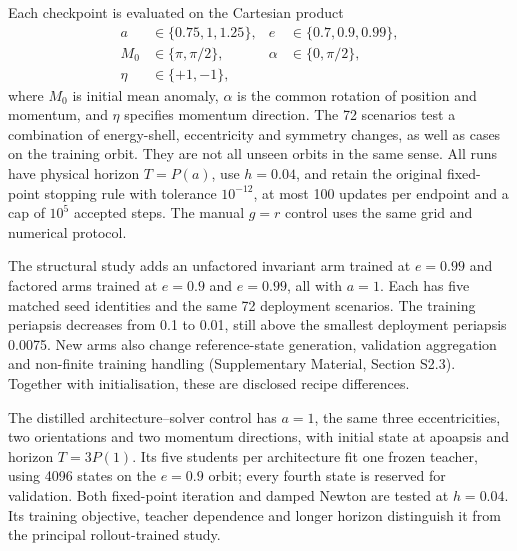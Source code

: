 \documentclass[final,3p,times]{elsarticle}
\begin{document}
Each checkpoint is evaluated on the Cartesian product
\begin{equation}
\begin{aligned}
 a&\in\{0.75,1,1.25\}, & e&\in\{0.7,0.9,0.99\},\\
 M_0&\in\{\pi,\pi/2\}, & \alpha&\in\{0,\pi/2\},\\
 \eta&\in\{+1,-1\},
\end{aligned}
\label{eq:kepler-deployment-grid}
\end{equation}
where $M_0$ is initial mean anomaly, $\alpha$ is the common rotation of
position and momentum, and $\eta$ specifies momentum direction. The
72 scenarios test a combination of energy-shell, eccentricity and symmetry
changes, as well as cases on the training orbit. They are not all unseen
orbits in the same sense. All runs have physical horizon $T=P(a)$, use
$h=0.04$, and retain the original fixed-point stopping rule with tolerance
$10^{-12}$, at most 100 updates per endpoint and a cap of $10^5$ accepted
steps. The manual $g=r$ control uses the same grid and numerical protocol.

The structural study adds an unfactored invariant arm trained at $e=0.99$
and factored arms trained at $e=0.9$ and $e=0.99$, all with $a=1$.
Each has five matched seed identities and the same 72 deployment scenarios.
The training periapsis decreases from 0.1 to 0.01, still above the smallest
deployment periapsis 0.0075. New arms also change reference-state
generation, validation aggregation and non-finite training handling
(Supplementary Material, Section S2.3). Together with initialisation,
these are disclosed recipe differences.

The distilled architecture--solver control has $a=1$, the same three
eccentricities, two orientations and two momentum directions, with initial
state at apoapsis and horizon $T=3P(1)$. Its five students per architecture
fit one frozen teacher, using 4096 states on the $e=0.9$ orbit; every fourth
state is reserved for validation. Both fixed-point iteration and damped
Newton are tested at $h=0.04$. Its training objective, teacher dependence
and longer horizon distinguish it from the principal rollout-trained study.
\end{document}
